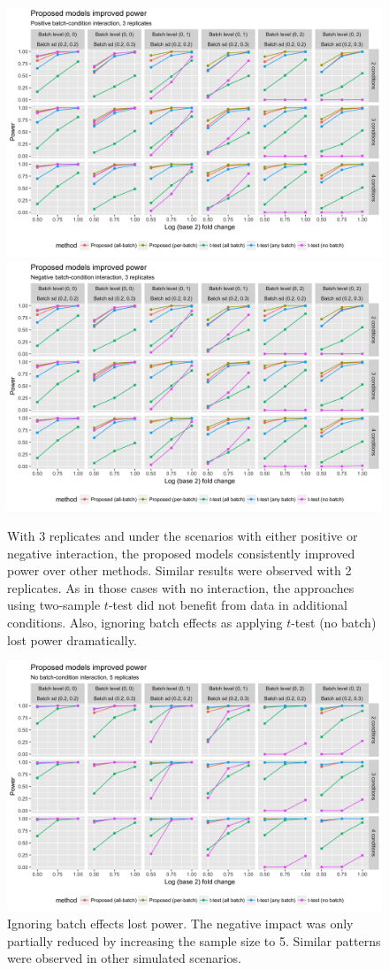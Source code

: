 \documentclass{mcp}
\begin{document}
\clearpage
\begin{figure}[h!]
\centering
\includegraphics[width=.85\textwidth]{sim/synpos_pwr_3}\\
\includegraphics[width=.85\textwidth]{sim/synneg_pwr_3}
\caption{With 3 replicates and under the scenarios with either positive or negative interaction, the proposed models consistently improved power over other methods. Similar results were observed with 2 replicates. As in those cases with no interaction, the approaches using two-sample $t$-test did not benefit from data in additional conditions. Also, ignoring batch effects as applying $t$-test (no batch) lost power dramatically. \label{fig:syn_pwr_3}}
\end{figure}


\begin{figure}[h!]
\centering
\includegraphics[width=.85\textwidth]{sim/synnull_pwr_5}
\caption{Ignoring batch effects lost power. The negative impact was only partially reduced by increasing the sample size to 5. Similar patterns were observed in other simulated scenarios. \label{fig:synnull_pwr_5}}
\end{figure}
\end{document}
